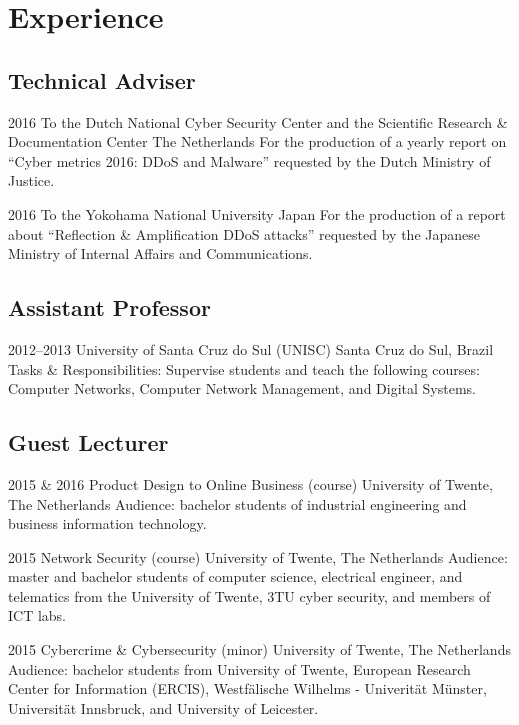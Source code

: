 \documentclass[print]{friggeri-cv} %
\begin{document}
\vspace{-0.7cm}
\section{Experience}

\subsection{Technical Adviser}
\begin{entrylist}
\entry
{2016}
{To the Dutch National Cyber Security Center and the Scientific Research \& Documentation Center}
{The Netherlands}
{For the production of a yearly report on ``Cyber metrics 2016: DDoS and Malware'' requested by the Dutch Ministry of Justice.}


\entry
{2016}
{To the Yokohama National University}
{Japan}
{For the production of a report about ``Reflection \& Amplification DDoS attacks'' requested by the Japanese Ministry of Internal Affairs and Communications.}
\end{entrylist}

\subsection{Assistant Professor}
\begin{entrylist}
\entry
{2012--2013}
{University of Santa Cruz do Sul (UNISC)}
{Santa Cruz do Sul, Brazil}
{Tasks \& Responsibilities: Supervise students and teach the following courses: Computer Networks, Computer Network Management, and Digital Systems.}
\end{entrylist}

\subsection{Guest Lecturer}
\begin{entrylist}
\entry
{2015 \& 2016}
{Product Design to Online Business (course)}
{University of Twente, The Netherlands}
{Audience: bachelor students of industrial engineering and business information technology.}

\entry
{2015}
{Network Security (course)}
{University of Twente, The Netherlands}
{Audience: master and bachelor students of computer science, electrical engineer, and telematics from the University of Twente, 3TU cyber security, and members of ICT labs. }

\entry
{2015}
{Cybercrime \& Cybersecurity (minor)}
{University of Twente, The Netherlands}
{Audience: bachelor students from University of Twente, European Research Center for Information (ERCIS), Westfälische Wilhelms - Univerität Münster, Universität Innsbruck, and University of Leicester. }
\end{entrylist}
\end{document}
